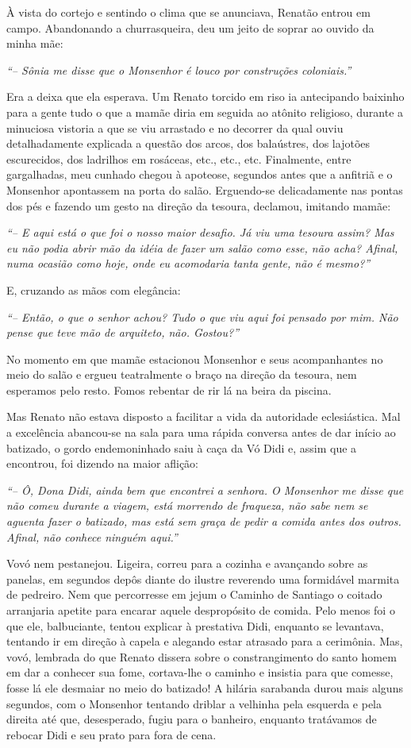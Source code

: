 À vista do cortejo e sentindo o clima que se anunciava, Renatão entrou em campo.
Abandonando a churrasqueira, deu um jeito de soprar ao ouvido da minha mãe: 

\textit{``-- Sônia me disse que o Monsenhor é louco por construções coloniais.''}

Era a deixa que ela esperava.
Um Renato torcido em riso ia antecipando baixinho para a gente tudo o que a mamãe diria em seguida ao atônito religioso, durante a minuciosa vistoria a que se viu arrastado e no decorrer da qual ouviu detalhadamente explicada a questão dos arcos, dos balaústres, dos lajotões escurecidos, dos ladrilhos em rosáceas, etc., etc., etc.
Finalmente, entre gargalhadas, meu cunhado chegou à apoteose, segundos antes que a anfitriã e o Monsenhor apontassem na porta do salão.
Erguendo-se delicadamente nas pontas dos pés e fazendo um gesto na direção da tesoura, declamou, imitando mamãe:

\textit{``-- E aqui está o que foi o nosso maior desafio.
Já viu uma tesoura assim? Mas eu não podia abrir mão da idéia de fazer um salão como esse, não acha? Afinal, numa ocasião como hoje, onde eu acomodaria tanta gente, não é mesmo?''}

E, cruzando as mãos com elegância:

\textit{``-- Então, o que o senhor achou? Tudo o que viu aqui foi pensado por mim.
Não pense que teve mão de arquiteto, não.
Gostou?''}

No momento em que mamãe estacionou Monsenhor e seus acompanhantes no meio do salão e ergueu teatralmente o braço na direção da tesoura, nem esperamos pelo resto.
Fomos rebentar de rir lá na beira da piscina.

Mas Renato não estava disposto a facilitar a vida da autoridade eclesiástica.
Mal a excelência abancou-se na sala para uma rápida conversa antes de dar início ao batizado, o gordo endemoninhado saiu à caça da Vó Didi e, assim que a encontrou, foi dizendo na maior aflição:

\textit{``-- Ô, Dona Didi, ainda bem que encontrei a senhora.
O Monsenhor me disse que não comeu durante a viagem, está morrendo de fraqueza, não sabe nem se aguenta fazer o batizado, mas está sem graça de pedir a comida antes dos outros.
Afinal, não conhece ninguém aqui.''}

Vovó nem pestanejou.
Ligeira, correu para a cozinha e avançando sobre as panelas, em segundos depôs diante do ilustre reverendo uma formidável marmita de pedreiro.
Nem que percorresse em jejum o Caminho de Santiago o coitado arranjaria apetite para encarar aquele despropósito de comida.
Pelo menos foi o que ele, balbuciante, tentou explicar à prestativa Didi, enquanto se levantava, tentando ir em direção à capela e alegando estar atrasado para a cerimônia.
Mas, vovó, lembrada do que Renato dissera sobre o constrangimento do santo homem em dar a conhecer sua fome, cortava-lhe o caminho e insistia para que comesse, fosse lá ele desmaiar no meio do batizado! A hilária sarabanda durou mais alguns segundos, com o Monsenhor tentando driblar a velhinha pela esquerda e pela direita até que, desesperado, fugiu para o banheiro, enquanto tratávamos de rebocar Didi e seu prato para fora de cena.


